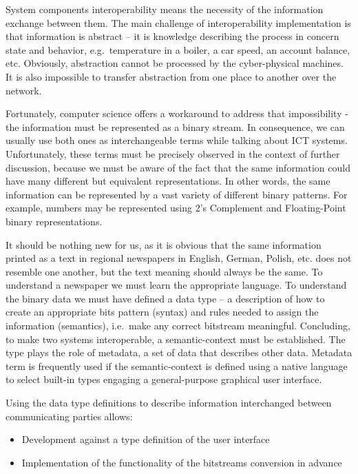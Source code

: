 \documentclass{jacsart}
\providecommand{\tightlist} { \setlength{\itemsep}{0pt}\setlength{\parskip}{0pt}}
\begin{document}
System components interoperability means the necessity of the
information exchange between them. The main challenge of
interoperability implementation is that information is abstract -- it is
knowledge describing the process in concern state and behavior,
e.g.~temperature in a boiler, a car speed, an account balance, etc.
Obviously, abstraction cannot be processed by the cyber-physical
machines. It is also impossible to transfer abstraction from one place
to another over the network.

Fortunately, computer science offers a workaround to address that
impossibility - the information must be represented as a binary stream.
In consequence, we can usually use both ones as interchangeable terms
while talking about ICT systems. Unfortunately, these terms must be
precisely observed in the context of further discussion, because we must
be aware of the fact that the same information could have many different
but equivalent representations. In other words, the same information can
be represented by a vast variety of different binary patterns. For
example, numbers may be represented using 2's Complement and
Floating-Point binary representations.

It should be nothing new for us, as it is obvious that the same
information printed as a text in regional newspapers in English, German,
Polish, etc. does not resemble one another, but the text meaning should
always be the same. To understand a newspaper we must learn the
appropriate language. To understand the binary data we must have defined
a data type -- a description of how to create an appropriate bits
pattern (syntax) and rules needed to assign the information (semantics),
i.e.~make any correct bitstream meaningful. Concluding, to make two
systems interoperable, a semantic-context must be established. The type
plays the role of metadata, a set of data that describes other data.
Metadata term is frequently used if the semantic-context is defined
using a native language to select built-in types engaging a
general-purpose graphical user interface.

Using the data type definitions to describe information interchanged
between communicating parties allows:

\begin{itemize}
      \tightlist
      \item
            Development against a type definition of the user interface
      \item
            Implementation of the functionality of the bitstreams conversion in
            advance
\end{itemize}
\end{document}
